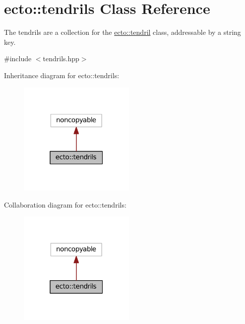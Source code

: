 \hypertarget{classecto_1_1tendrils}{}\section{ecto\+:\+:tendrils Class Reference}
\label{classecto_1_1tendrils}


The tendrils are a collection for the \hyperlink{classecto_1_1tendril}{ecto\+::tendril} class, addressable by a string key.  




{\ttfamily \#include $<$tendrils.\+hpp$>$}



Inheritance diagram for ecto\+:\+:tendrils\+:\nopagebreak
\begin{figure}[H]
\begin{center}
\leavevmode
\includegraphics[width=159pt]{classecto_1_1tendrils__inherit__graph}
\end{center}
\end{figure}


Collaboration diagram for ecto\+:\+:tendrils\+:\nopagebreak
\begin{figure}[H]
\begin{center}
\leavevmode
\includegraphics[width=159pt]{classecto_1_1tendrils__coll__graph}
\end{center}
\end{figure}
